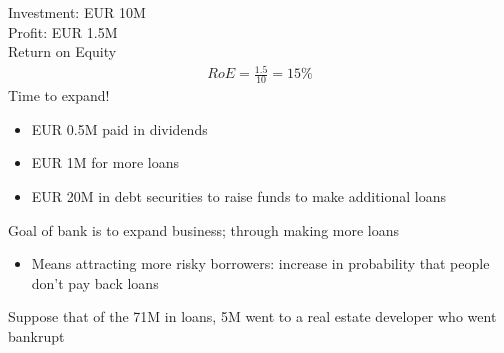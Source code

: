 \documentclass{beamer}
\begin{document}
\begin{frame}
 Investment: EUR 10M\\
 Profit: EUR 1.5M\\
 Return on Equity
 \begin{align}
   RoE=\frac{1.5}{10}=15\%
 \end{align}
 \medskip
 Time to expand! 
\begin{itemize}
  \item EUR 0.5M paid in dividends
  \item EUR 1M for more loans
  \item EUR 20M in debt securities to raise funds to make additional loans
\end{itemize}
\end{frame}
\begin{frame}
\begin{table}[!h] \centering
\caption{Balance sheet after expanding the business}
\end{table}
\end{frame}

\begin{frame}
  Goal of bank is to expand business; through making more loans
  \begin{itemize}
    \item Means attracting more risky borrowers: increase in probability that people don't pay back loans
  \end{itemize}
  \medskip
  Suppose that of the 71M in loans, 5M went to a real estate developer who went bankrupt
\end{frame}
\end{document}
